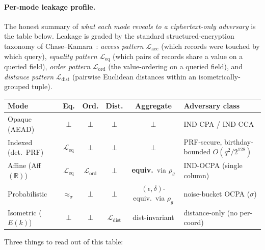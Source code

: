 \documentclass[11pt,letterpaper]{article}
\begin{document}
\paragraph{Per-mode leakage profile.}
The honest summary of \emph{what each mode reveals to a
ciphertext-only adversary} is the table below. Leakage is graded by
the standard structured-encryption taxonomy of
Chase--Kamara~\cite{chase2010structured}: \emph{access pattern}
$\mathcal{L}_{\mathrm{acc}}$ (which records were touched by which
query), \emph{equality pattern} $\mathcal{L}_{\mathrm{eq}}$ (which
pairs of records share a value on a queried field), \emph{order
pattern} $\mathcal{L}_{\mathrm{ord}}$ (the value-ordering on a
queried field), and \emph{distance pattern}
$\mathcal{L}_{\mathrm{dist}}$ (pairwise Euclidean distances within
an isometrically-grouped tuple).
\begin{center}\footnotesize
\renewcommand{\arraystretch}{1.2}
\setlength{\tabcolsep}{4pt}
\begin{tabularx}{\linewidth}{|l|c|c|c|c|X|}
\hline
\textbf{Mode} & \textbf{Eq.} & \textbf{Ord.} & \textbf{Dist.} & \textbf{Aggregate} & \textbf{Adversary class} \\
\hline
Opaque (AEAD)              & $\bot$ & $\bot$ & $\bot$ & $\bot$ & IND-CPA / IND-CCA \\
Indexed (det.\ PRF)        & $\mathcal{L}_{\mathrm{eq}}$ & $\bot$ & $\bot$ & $\bot$ & PRF-secure, birthday-bounded $O(q^2/2^{128})$ \\
Affine (Aff$(\mathbb{R})$) & $\mathcal{L}_{\mathrm{eq}}$ & $\mathcal{L}_{\mathrm{ord}}$ & $\bot$ & \textbf{equiv.}~via $\rho_g$ & IND-OCPA (single column) \\
Probabilistic              & $\approx_\sigma$ & $\bot$ & $\bot$ & $(\epsilon,\delta)$-equiv.~via $\rho_g$ & noise-bucket OCPA ($\sigma$) \\
Isometric ($E(k)$)         & $\bot$ & $\bot$ & $\mathcal{L}_{\mathrm{dist}}$ & dist-invariant & distance-only (no per-coord) \\
\hline
\end{tabularx}
\end{center}
Three things to read out of this table:
\end{document}

